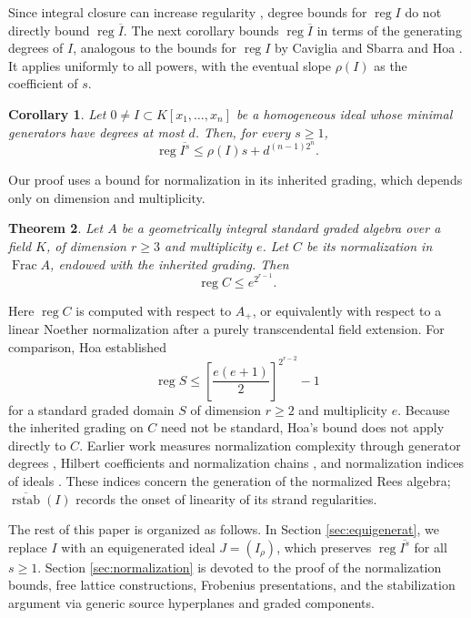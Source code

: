 \documentclass[12pt]{amsart}
\numberwithin{equation}{section}
\newtheorem{theorem}{Theorem}[section]
\newtheorem{corollary}[theorem]{Corollary}
\theoremstyle{definition}
\theoremstyle{remark}
\numberwithin{equation}{section}
\DeclareMathOperator{\reg}{reg}
\newcommand{\rstabn}{\overline{\operatorname{rstab}}}
\begin{document}
Since integral closure can increase regularity \cite{Misra}, degree bounds for $\reg I$ do not directly bound $\reg\overline I$.
The next corollary bounds $\reg\overline I$ in terms of the generating degrees of $I$,  analogous to the bounds for $\reg I$ by  Caviglia and Sbarra  \cite{CS} and Hoa \cite{HoaReg}.
It applies uniformly to all powers, with the eventual slope $\rho(I)$ as the coefficient of $s$.
\begin{corollary}\label{cor:regularity-powers}
	Let $0\ne I\subset K[x_1,\ldots,x_n]$ be a homogeneous ideal whose minimal generators have degrees at most $d$.
	Then, for every $s\ge1$,
	\[
	\reg\overline{I^s}\le \rho(I)s+d^{(n-1)2^n}.
	\]
\end{corollary}

Our proof uses a bound for normalization in its inherited grading, which depends only on dimension and multiplicity.

\begin{theorem}\label{thm:normalization}
	Let $A$ be a geometrically integral standard graded algebra over  a field $K$, of dimension $r\ge3$ and multiplicity $e$.
	Let $C$ be its normalization in $\operatorname{Frac}A$,  endowed  with the inherited grading. Then
	\[
	\reg C\le e^{2^{r-1}}.
	\]
\end{theorem}
Here $\reg C$ is computed with respect to $A_+$, or equivalently with respect to a linear Noether normalization after a purely
transcendental field extension. For comparison, Hoa \cite[Theorem~1.5(i)]{HoaReg} established
\[
\reg S\le\left[\frac{e(e+1)}2\right]^{2^{r-2}}-1
\]
for a standard graded domain $S$ of dimension $r\ge2$ and multiplicity $e$.  Because the inherited grading on $C$ need not be
standard,  Hoa's bound does not apply directly to $C$.
Earlier work measures normalization complexity through generator degrees \cite{UV}, Hilbert coefficients and normalization chains
\cite{PV}, and normalization indices of ideals \cite{PUVV}. These indices concern  the generation of the normalized Rees algebra;
$\rstabn(I)$ records the onset of linearity of its strand regularities.

The rest of this paper is organized as follows. In Section  \ref{sec:equigenerat}, we replace $I$ with an equigenerated ideal $J=(I_{\rho})$, which preserves $\reg\overline{I^{s}}$ for all $s\ge1$. Section \ref{sec:normalization}  is devoted to the proof of the normalization bounds, free lattice constructions, Frobenius presentations, and the stabilization argument via generic source hyperplanes and graded components.
\end{document}
